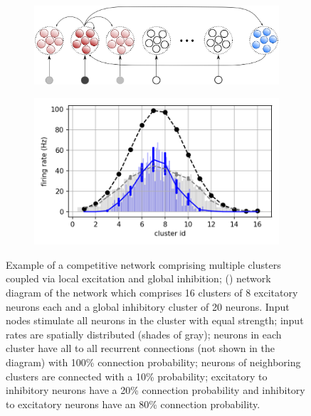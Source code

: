 \begin{figure}[h]
\centering
\begin{subfigure}{.45\textwidth}
\centering
\includegraphics[width=\linewidth]{img/chapter4/position-wta.png}
\caption{}
\label{fig:global_inh_wta_sketch}
\end{subfigure}
\begin{subfigure}{.5\textwidth}
\centering
\includegraphics[width=\textwidth]{img/chapter3/16_clusters_ff_and_global_INH_bars_blue.png}
\caption{}
\label{fig:bump_global_inh_WTA}
\end{subfigure}
\caption[Population code in a soft Winnter-Take-all network. Population code sharpening.]{Example of a competitive network comprising multiple clusters coupled via local excitation and global inhibition; () network diagram of the network which comprises 16 clusters of 8 excitatory neurons each and a global inhibitory cluster of 20 neurons. Input nodes stimulate all neurons in the cluster with equal strength; input rates are spatially distributed (shades of gray); neurons in each cluster have all to all recurrent connections (not shown in the diagram) with 100\% connection probability; neurons of neighboring clusters are connected with a 10\% probability; excitatory to inhibitory neurons have a 20\% connection probability and inhibitory to excitatory neurons have an 80\% connection probability.
}
\end{figure}
